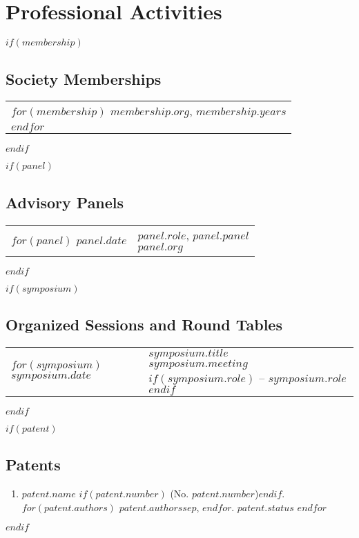 \documentclass[12pt, martgin, line]{article}
\begin{document}
\section*{Professional Activities}

$if(membership)$
\subsection*{Society Memberships}
\begin{tabular}{l}
$for(membership)$
$membership.org$, $membership.years$\\
$endfor$
\end{tabular}
$endif$

$if(panel)$
\subsection*{Advisory Panels}
\setlength{\extrarowheight}{.75em}
\begin{tabular}{lp{5.5in}}   
$for(panel)$
$panel.date$&
\parbox[t]{5.5in}{$panel.role$, $panel.panel$\\
 \textit{$panel.org$}}\\
$endfor$
\end{tabular}
\setlength{\extrarowheight}{0em}
$endif$

$if(symposium)$
\subsection*{Organized Sessions and Round Tables}
\setlength{\extrarowheight}{.75em}
\begin{tabular}{lp{5.5in}}   
$for(symposium)$
$symposium.date$&
\parbox[t]{5.5in}{
   $symposium.title$\\
 \textit{$symposium.meeting$}
 $if(symposium.role)$ -- $symposium.role$$endif$ 
 }\\
$endfor$
\end{tabular}
\setlength{\extrarowheight}{0em}
$endif$

$if(patent)$
\subsection*{Patents}
\begin{enumerate}
 $for(patent)$
 \item 
 $patent.name$
 $if(patent.number)$ (No. $patent.number$)$endif$.
 $for(patent.authors)$
 $patent.authors$$sep$,
 $endfor$.
 \textit{$patent.status$}
 $endfor$
\end{enumerate}
$endif$
\end{document}
